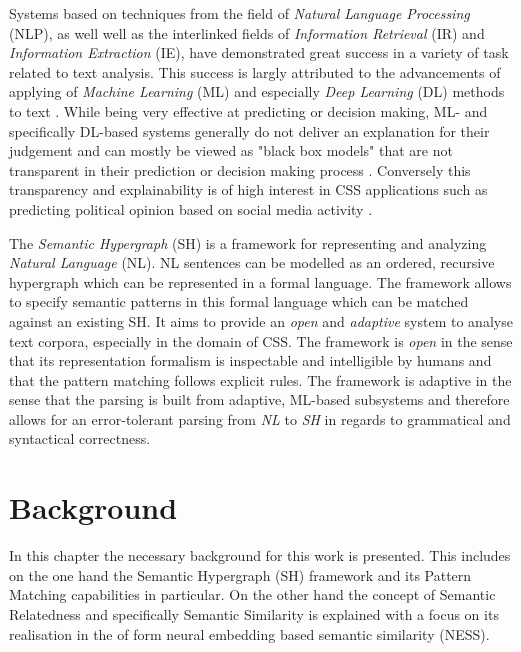 \documentclass[11pt]{scrreprt}
\let\cite\parencite  %
\begin{document}
Systems based on techniques from the field of \textit{ Natural Language Processing} (NLP), as well well as the interlinked fields of \textit{Information Retrieval} (IR) and \textit{Information Extraction} (IE), have demonstrated great success in a variety of task related to text analysis. This success is largly attributed to the advancements of applying of \textit{Machine Learning} (ML) and especially \textit{Deep Learning} (DL) methods to text \cite{hirschbergAdvancesNaturalLanguage2015} \cite{qiuPretrainedModelsNatural2020}. While being very effective at predicting or decision making, ML- and specifically DL-based systems generally do not deliver an explanation for their judgement and can mostly be viewed as "black box models" that are not transparent in their prediction or decision making process \cite{rudinStopExplainingBlack2019}. Conversely this transparency and explainability is of high interest in CSS applications such as predicting political opinion based on social media activity \cite{wilkersonLargeScaleComputerizedText2017}.

The \textit{Semantic Hypergraph} (SH) \cite{menezesSemanticHypergraphs2021} is a framework for representing and analyzing \textit{Natural Language} (NL). NL sentences can be modelled as an ordered, recursive hypergraph which can be represented in a formal language. The framework allows to specify semantic patterns in this formal language which can be matched against an existing SH. It aims to provide an \textit{open} and \textit{adaptive} system to analyse text corpora, especially in the domain of CSS. The framework is \textit{open} in the sense that its representation formalism is inspectable and intelligible by humans and that the pattern matching follows explicit rules. The framework is adaptive in the sense that the parsing is built from adaptive, ML-based subsystems and therefore allows for an error-tolerant parsing from \textit{NL} to \textit{SH} in regards to grammatical and syntactical correctness.



\chapter{Background}
In this chapter the necessary background for this work is presented. This includes on the one hand the Semantic Hypergraph (SH) framework and its Pattern Matching capabilities in particular. On the other hand the concept of Semantic Relatedness and specifically Semantic Similarity is explained with a focus on its realisation in the of form neural embedding based semantic similarity (NESS).
\end{document}

